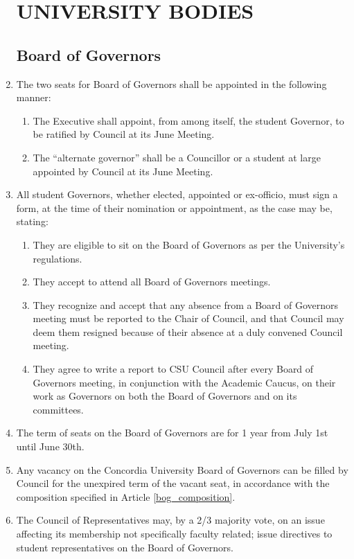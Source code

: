 \documentclass[oneside]{book}
\begin{document}
\begin{enumerate}
\part{\label{UNIVERSITY_BODIES}UNIVERSITY BODIES}
\chapter{\label{Board_of_Governors}Board of Governors }
\item \label{bog_composition} The two seats for Board of Governors shall be appointed in the following
manner: 

\begin{enumerate}
\item The Executive shall appoint, from among itself, the student Governor,
to be ratified by Council at its June Meeting. 
\item The ``alternate governor'' shall be a Councillor or a student
at large appointed by Council at its June Meeting. 
\end{enumerate}
\item All student Governors, whether elected, appointed or ex-officio, must
sign a form, at the time of their nomination or appointment, as the
case may be, stating: 

\begin{enumerate}
\item They are eligible to sit on the Board of Governors as per the University's
regulations. 
\item They accept to attend all Board of Governors meetings. 
\item They recognize and accept that any absence from a Board of Governors
meeting must be reported to the Chair of Council, and that Council
may deem them resigned because of their absence at a duly convened
Council meeting. 
\item They agree to write a report to CSU Council after every Board of Governors
meeting, in conjunction with the Academic Caucus, on their work as
Governors on both the Board of Governors and on its committees. 
\end{enumerate}
\item The term of seats on the Board of Governors are for 1 year from July
1st until June 30th. 
\item Any vacancy on the Concordia University Board of Governors can be
filled by Council for the unexpired term of the vacant seat, in accordance with 
the composition specified in Article \ref{bog_composition}.
\item The Council of Representatives may, by a 2/3 majority vote, on an
issue affecting its membership not specifically faculty related; issue
directives to student representatives on the Board of Governors. 


\end{enumerate}
\end{document}
